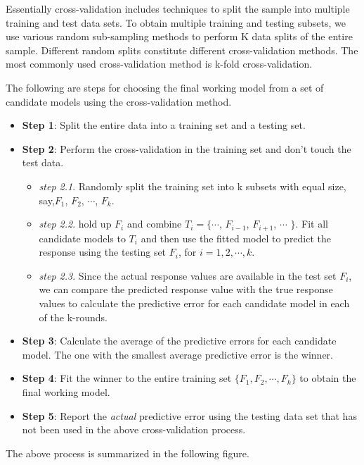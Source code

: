 \documentclass[
]{book}
\providecommand{\tightlist}{%
  \setlength{\itemsep}{0pt}\setlength{\parskip}{0pt}}
\begin{document}
Essentially cross-validation includes techniques to split the sample into multiple training and test data sets. To obtain multiple training and testing subsets, we use various random sub-sampling methods to perform K data splits of the entire sample. Different random splits constitute different cross-validation methods. The most commonly used cross-validation method is k-fold cross-validation.

The following are steps for choosing the final working model from a set of candidate models using the cross-validation method.

\begin{itemize}
\item
  \textbf{Step 1}: Split the entire data into a training set and a testing set.
\item
  \textbf{Step 2}: Perform the cross-validation in the training set and don't touch the test data.

  \begin{itemize}
  \tightlist
  \item
    \emph{step 2.1}. Randomly split the training set into k subsets with equal size, say,\(F_1\), \(F_2\), \(\cdots\), \(F_k\).
  \item
    \emph{step 2.2}. hold up \(F_i\) and combine \(T_i =\{\)\(\cdots\), \(F_{i-1}\), \(F_{i+1}\), \(\cdots\) \(\}\). Fit all candidate models to \(T_i\) and then use the fitted model to predict the response using the testing set \(F_i\), for \(i=1, 2, \cdots, k\).\\
  \item
    \emph{step 2.3}. Since the actual response values are available in the test set \(F_i\), we can compare the predicted response value with the true response values to calculate the predictive error for each candidate model in each of the k-rounds.
  \end{itemize}
\item
  \textbf{Step 3}: Calculate the average of the predictive errors for each candidate model. The one with the smallest average predictive error is the winner.
\item
  \textbf{Step 4}: Fit the winner to the entire training set \(\{F_1, F_2, \cdots, F_k\}\) to obtain the final working model.
\item
  \textbf{Step 5}: Report the \emph{actual} predictive error using the testing data set that has not been used in the above cross-validation process.
\end{itemize}

The above process is summarized in the following figure.
\end{document}
